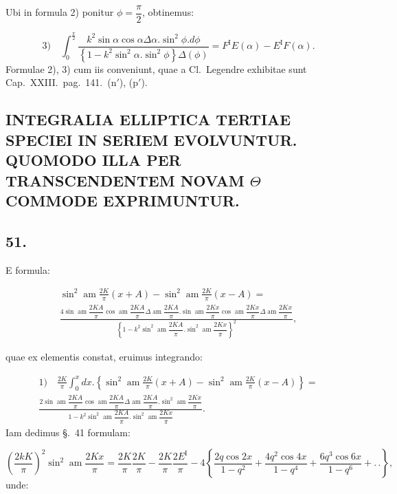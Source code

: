 \documentclass{article}
\begin{document}
Ubi in formula 2) ponitur $\phi=\dfrac{\pi}{2}$, obtinemus:

\[
\text{3)}\quad\int_{0}^{\frac{\pi}{2}}\frac{k^{2}\sin\alpha\cos\alpha\Delta\alpha.\sin^{2}\phi.d\phi}{\left\{1-k^{2}\sin^{2}\alpha.\sin^{2}\phi\right\}\Delta(\phi)}=F^{\mathrm{I}}E(\alpha)-E^{\mathrm{I}}F(\alpha).
\]
Formulae 2), 3) cum iis conveniunt, quae a Cl.\ Legendre exhibitae sunt Cap.\ XXIII.\ pag.\ 141.\ (n$'$), (p$'$).

\subsection*{INTEGRALIA ELLIPTICA TERTIAE SPECIEI IN SERIEM EVOLVUNTUR. QUOMODO ILLA PER TRANSCENDENTEM NOVAM $\Theta$ COMMODE EXPRIMUNTUR.}

\subsection*{51.}

E formula:

\[
\begin{gathered}
\sin^{2}\operatorname{am}\frac{2K}{\pi}(x+A)-\sin^{2}\operatorname{am}\frac{2K}{\pi}(x-A)=\\[1.5ex]
\frac{4\sin\operatorname{am}\dfrac{2KA}{\pi}\cos\operatorname{am}\dfrac{2KA}{\pi}\Delta\operatorname{am}\dfrac{2KA}{\pi}.\sin\operatorname{am}\dfrac{2Kx}{\pi}\cos\operatorname{am}\dfrac{2Kx}{\pi}\Delta\operatorname{am}\dfrac{2Kx}{\pi}}{\left\{1-k^{2}\sin^{2}\operatorname{am}\dfrac{2KA}{\pi}.\sin^{2}\operatorname{am}\dfrac{2Kx}{\pi}\right\}^{2}},
\end{gathered}
\]

quae ex elementis constat, eruimus integrando:

\[
\begin{gathered}
\text{1)}\quad\frac{2K}{\pi}\int_{0}^{x}dx.\left\{\sin^{2}\operatorname{am}\frac{2K}{\pi}(x+A)-\sin^{2}\operatorname{am}\frac{2K}{\pi}(x-A)\right\}=\\[1.5ex]
\frac{2\sin\operatorname{am}\dfrac{2KA}{\pi}\cos\operatorname{am}\dfrac{2KA}{\pi}\Delta\operatorname{am}\dfrac{2KA}{\pi}.\sin^{2}\operatorname{am}\dfrac{2Kx}{\pi}}{1-k^{2}\sin^{2}\operatorname{am}\dfrac{2KA}{\pi}.\sin^{2}\operatorname{am}\dfrac{2Kx}{\pi}}.
\end{gathered}
\]
Iam dedimus §.\ 41 formulam:

\[
\left(\frac{2kK}{\pi}\right)^{2}\sin^{2}\operatorname{am}\frac{2Kx}{\pi}=\frac{2K}{\pi}\frac{2K}{\pi}-\frac{2K}{\pi}\frac{2E^{\mathrm{I}}}{\pi}-4\left\{\frac{2q\cos2x}{1-q^{2}}+\frac{4q^{2}\cos4x}{1-q^{4}}+\frac{6q^{3}\cos6x}{1-q^{6}}+.\,.\right\},
\]
unde:
\end{document}

